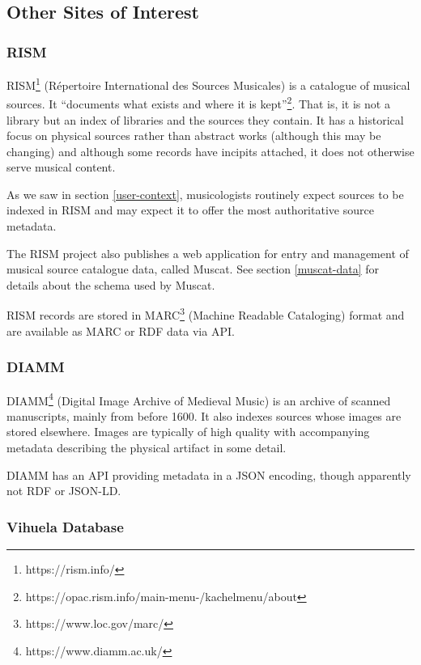 \documentclass[sigconf, nonacm=true]{acmart}
\begin{document}
\begin{sloppypar}
  \subsection{Other Sites of Interest}
  
  \subsubsection{RISM}

  RISM\footnote{https://rism.info/} (R\'epertoire International des
  Sources Musicales) is a catalogue of musical sources. It ``documents
  what exists and where it is
  kept''\footnote{https://opac.rism.info/main-menu-/kachelmenu/about}. That
  is, it is not a library but an index of libraries and the sources
  they contain. It has a historical focus on physical sources rather
  than abstract works (although this may be changing) and although
  some records have incipits attached, it does not otherwise serve
  musical content.

  As we saw in section \ref{user-context}, musicologists routinely
  expect sources to be indexed in RISM and may expect it to offer the
  most authoritative source metadata.

  The RISM project also publishes a web application for entry and
  management of musical source catalogue data, called Muscat. See
  section \ref{muscat-data} for details about the schema used by
  Muscat.

  RISM records are stored in MARC\footnote{https://www.loc.gov/marc/}
  (Machine Readable Cataloging) format and are available as MARC or
  RDF data via API.

  \subsubsection{DIAMM}

  DIAMM\footnote{https://www.diamm.ac.uk/} (Digital Image Archive of
  Medieval Music) is an archive of scanned manuscripts, mainly from
  before 1600. It also indexes sources whose images are stored
  elsewhere. Images are typically of high quality with accompanying
  metadata describing the physical artifact in some detail.

  DIAMM has an API providing metadata in a JSON encoding, though
  apparently not RDF or JSON-LD.
  
  \subsubsection{Vihuela Database}


\end{sloppypar}
\end{document}
